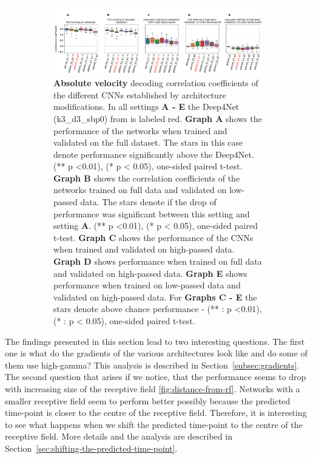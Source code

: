 \begin{itemize}
\begin{figure}[!htpb]
\begin{subfigure}[b]{\textwidth}
   \includegraphics[width=1\linewidth]{img/ch4/original_setting_absVel_performance_comparison}
   \caption{\textbf{Absolute velocity} decoding correlation coefficients of the different CNNs established by architecture modifications. In all settings \textbf{
   A - E} the Deep4Net (k3\_d3\_sbp0) from \cite{Hammer-2021} is labeled red. \textbf{Graph A} shows the performance of the networks when trained and validated on the full dataset. The stars in this case denote performance significantly above the Deep4Net. (** p <0.01), (* p < 0.05), one-sided paired t-test.
   \textbf{Graph B} shows the correlation coefficients of the networks trained on full data and validated on low-passed data. 
   The stars denote if the drop of performance was significant between this setting and setting \textbf{A}. (** p <0.01), (* p < 0.05), one-sided paired t-test.
   \textbf{Graph C} shows the performance of the CNNs when trained and validated on high-passed data. \textbf{Graph D} shows performance when trained on full data and validated on high-passed data. \textbf{Graph E} shows performance when trained on low-passed data and validated on high-passed data. For \textbf{Graphs C - E} the stars denote above chance performance - (** : p <0.01), (* : p < 0.05), one-sided paired t-test.}
   \label{fig:original-performances-absolute-velocity}
\end{subfigure}
\caption[]{}
\end{figure}\label{fig:original-performances}


\end{itemize}

The findings presented in this section lead to two interesting questions.
The first one  is what do the gradients of the various architectures look like and do some of them use high-gamma?
This analysis is described in Section~\ref{subsec:gradients}.
The second question that arises if we notice, that the performance seems to drop with increasing size of the receptive field \cref{fig:distance-from-rf}.
Networks with a smaller receptive field seem to perform better possibly because the predicted time-point is closer to the centre of the receptive field.
Therefore, it is interesting to see what happens when we shift the predicted time-point to the centre of the receptive field.
More details and the analysis are described in Section~\ref{sec:shifting-the-predicted-time-point}.

